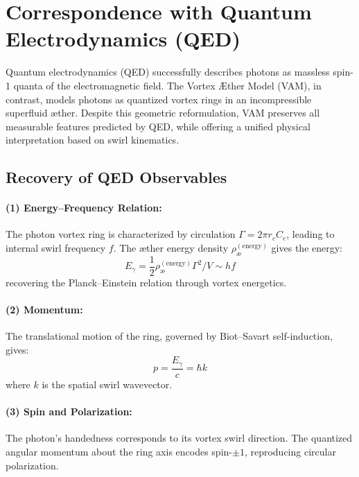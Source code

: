 \section{Correspondence with Quantum Electrodynamics (QED)}\label{sec:qed-correspondence}

Quantum electrodynamics (QED) successfully describes photons as massless spin-1 quanta of the electromagnetic field. The Vortex \AE ther Model (VAM), in contrast, models photons as quantized vortex rings in an incompressible superfluid \ae ther. Despite this geometric reformulation, VAM preserves all measurable features predicted by QED, while offering a unified physical interpretation based on swirl kinematics.

\subsection{Recovery of QED Observables}

\paragraph{(1) Energy–Frequency Relation:}
The photon vortex ring is characterized by circulation $\Gamma = 2\pi r_c C_e$, leading to internal swirl frequency $f$. The æther energy density $\rho_\text{\ae}^{(\text{energy})}$ gives the energy:
\begin{equation}
    E_\gamma = \frac{1}{2} \rho_\text{\ae}^{(\text{energy})} \Gamma^2 / V \sim h f
\end{equation}
recovering the Planck–Einstein relation through vortex energetics.

\paragraph{(2) Momentum:}
The translational motion of the ring, governed by Biot--Savart self-induction, gives:
\begin{equation}
    p = \frac{E_\gamma}{c} = \hbar k
\end{equation}
where $k$ is the spatial swirl wavevector.

\paragraph{(3) Spin and Polarization:}
The photon's handedness corresponds to its vortex swirl direction. The quantized angular momentum about the ring axis encodes spin-$\pm1$, reproducing circular polarization.

